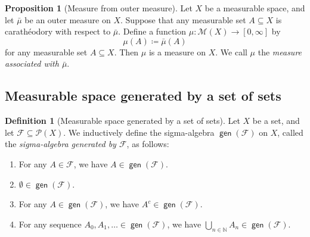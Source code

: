 \documentclass{article}
\theoremstyle{definition}
\newtheorem{proposition}[theorem]{Proposition}
\newtheorem{definition}[theorem]{Definition}
\DeclareMathOperator{\gen}{\mathsf{gen}}
\begin{document}
\begin{proposition}[Measure from outer measure]
  Let $X$ be a measurable space,
  and let $\bar{\mu}$ be an outer measure on $X$.
  Suppose that any measurable set $A \subseteq X$ 
  is carath\'eodory with respect to $\bar{\mu}$.
  Define a function $\mu : \mathcal{M}(X) \to [0, \infty]$ by
  \begin{equation*}
    \mu(A) \coloneqq \bar{\mu} (A)
  \end{equation*}
  for any measurable set $A \subseteq X$.
  Then $\mu$ is a measure on $X$.
  We call $\mu$ the \emph{measure associated with $\bar{\mu}$}.
\end{proposition}


\subsection{Measurable space generated by a set of sets}

\begin{definition}[Measurable space generated by a set of sets]
  Let $X$ be a set,
  and let $\mathcal{F} \subseteq \mathcal{P}(X)$.
  We inductively define the sigma-algebra $\gen (\mathcal{F})$ on $X$,
  called the \emph{sigma-algebra generated by $\mathcal{F}$},
  as follows:
  \begin{enumerate}
    \item For any $A \in \mathcal{F}$, we have $A \in \gen (\mathcal{F})$.
    \item $\emptyset \in \gen (\mathcal{F})$.
    \item For any $A \in \gen (\mathcal{F})$, we have $A^c \in \gen (\mathcal{F})$.
    \item For any sequence $A_0, A_1, \dots \in \gen (\mathcal{F})$,
      we have $\bigcup_{n \in \mathbb{N}} A_n \in \gen (\mathcal{F})$.
  \end{enumerate}
\end{definition}
\end{document}
